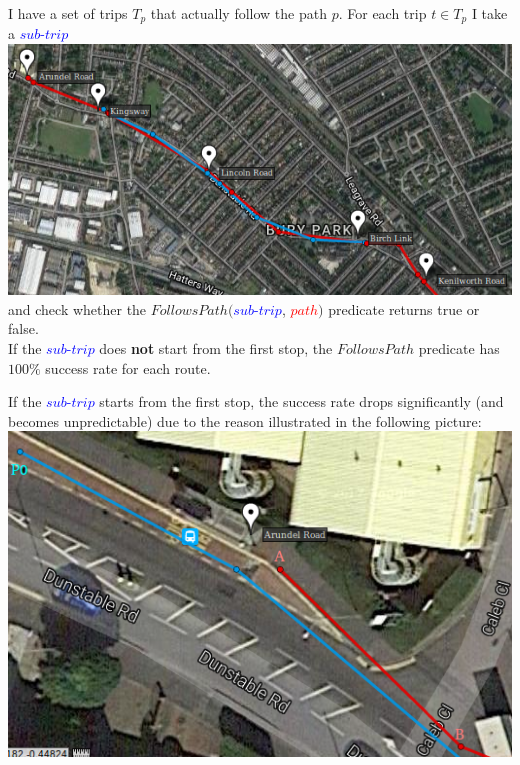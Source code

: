 \documentclass[12pt,a4paper,oneside,openright]{report}
\begin{document}
I have a set of trips $T_p$ that actually follow the path $p$.
For each trip $t \in T_p$ I take a \textcolor{blue}{$sub$-$trip$} \\
\includegraphics[scale = 0.7]{figs/stop1.png} \\

and check whether the
$FollowsPath($\textcolor{blue}{$sub$-$trip$}, \textcolor{red}{$path$}$)$ 
predicate returns true or false. \\

If the \textcolor{blue}{$sub$-$trip$} does \textbf{not} start from the 
first stop, the $FollowsPath$ predicate has $100\%$ success rate 
for each route. \\

\newpage

If the \textcolor{blue}{$sub$-$trip$} starts from the first stop,
the success rate drops significantly (and becomes unpredictable) due to 
the reason illustrated in the following picture: \\

\includegraphics[scale = 0.7]{figs/stop0.png} \\
\end{document}
